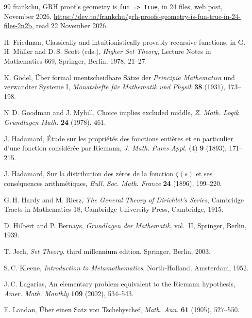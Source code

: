 \documentclass[11pt]{article}
\theoremstyle{definition}
\theoremstyle{remark}
\DeclareRobustCommand{\lean}[1]{{\renewcommand{\_}{\textunderscore\allowbreak}\texttt{#1}}}
\begin{document}
\begin{thebibliography}{99}
 frankchu, GRH proof's geometry is \lean{fun \_ \_ \_ => True}, in 24 files, web post, November 2026, \url{https://dev.to/frankchu/grh-proofs-geometry-is-fun-true-in-24-files-2n2b}, read 22 November 2026.

 H. Friedman, Classically and intuitionistically provably recursive functions, in G.\,H. M\"uller and D.\,S. Scott (eds.), \emph{Higher Set Theory}, Lecture Notes in Mathematics 669, Springer, Berlin, 1978, 21--27.

 K. G\"odel, \"Uber formal unentscheidbare S\"atze der \emph{Principia Mathematica} und verwandter Systeme I, \emph{Monatshefte f\"ur Mathematik und Physik} \textbf{38} (1931), 173--198.

 N.\,D. Goodman and J. Myhill, Choice implies excluded middle, \emph{Z. Math. Logik Grundlagen Math.} \textbf{24} (1978), 461.

 J. Hadamard, \'Etude sur les propri\'et\'es des fonctions enti\`eres et en particulier d'une fonction consid\'er\'ee par Riemann, \emph{J. Math. Pures Appl.} (4) \textbf{9} (1893), 171--215.

 J. Hadamard, Sur la distribution des z\'eros de la fonction $\zeta(s)$ et ses cons\'equences arithm\'etiques, \emph{Bull. Soc. Math. France} \textbf{24} (1896), 199--220.

 G.\,H. Hardy and M. Riesz, \emph{The General Theory of Dirichlet's Series}, Cambridge Tracts in Mathematics 18, Cambridge University Press, Cambridge, 1915.

 D. Hilbert and P. Bernays, \emph{Grundlagen der Mathematik}, vol.~II, Springer, Berlin, 1939.

 T. Jech, \emph{Set Theory}, third millennium edition, Springer, Berlin, 2003.

 S.\,C. Kleene, \emph{Introduction to Metamathematics}, North-Holland, Amsterdam, 1952.

 J.\,C. Lagarias, An elementary problem equivalent to the Riemann hypothesis, \emph{Amer. Math. Monthly} \textbf{109} (2002), 534--543.

 E. Landau, \"Uber einen Satz von Tschebyschef, \emph{Math. Ann.} \textbf{61} (1905), 527--550.


\end{thebibliography}
\end{document}
